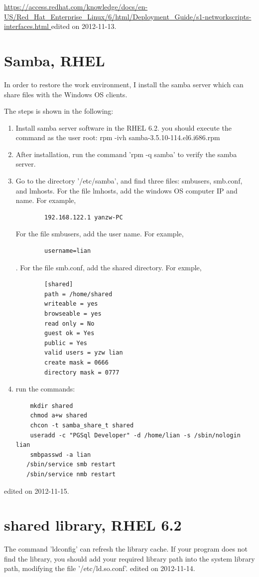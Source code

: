 \url{https://access.redhat.com/knowledge/docs/en-US/Red_Hat_Enterprise_Linux/6/html/Deployment_Guide/s1-networkscripts-interfaces.html }
\hfill {\tiny  edited on 2012-11-13.}

\section{Samba, RHEL}
In order to restore the work environment, I install the samba server which can share files with the Windows OS clients.

The steps is shown in the following:
\begin{enumerate}[(1)]
\item Install samba server software in the RHEL 6.2.  you should execute the command as the user root: rpm -ivh samba-3.5.10-114.el6.i686.rpm
\item After installation, run the command 'rpm -q samba' to verify the samba server.
\item Go to the directory '/etc/samba', and find three files: smbusers, smb.conf, and lmhosts. For the file lmhosts, add the windows OS computer IP and name. For example,
\begin{verbatim}
        192.168.122.1 yanzw-PC
\end{verbatim}
For the file smbusers, add the user name. For example,
\begin{verbatim}
        username=lian
\end{verbatim}. 
For the file smb.conf, add the shared directory. For exmple, 
\begin{verbatim}
        [shared]
        path = /home/shared
        writeable = yes
        browseable = yes
        read only = No
        guest ok = Yes
        public = Yes
        valid users = yzw lian
        create mask = 0666
        directory mask = 0777
\end{verbatim}
\item run the commands:
\begin{verbatim}
    mkdir shared
    chmod a+w shared
    chcon -t samba_share_t shared
    useradd -c "PGSql Developer" -d /home/lian -s /sbin/nologin lian
    smbpasswd -a lian
   /sbin/service smb restart
   /sbin/service nmb restart
\end{verbatim}
\end{enumerate}
\hfill {\tiny  edited on 2012-11-15.}

\section{shared library, RHEL 6.2}
The command 'ldconfig' can refresh the library cache. 
If your program does not find the library, you should add your required library path into the system library path, modifying the file '/etc/ld.so.conf'.
\hfill {\tiny  edited on 2012-11-14.}

